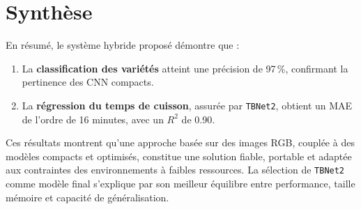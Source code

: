 \section{Synthèse}

En résumé, le système hybride proposé démontre que :
\begin{enumerate}
	\item La \textbf{classification des variétés} atteint une précision de 97\,\%, confirmant la pertinence des CNN compacts.
	\item La \textbf{régression du temps de cuisson}, assurée par \texttt{TBNet2}, obtient un MAE de l’ordre de 16 minutes, avec un $R^2$ de 0.90.
\end{enumerate}

Ces résultats montrent qu’une approche basée sur des images RGB, couplée à des modèles compacts et optimisés, constitue une solution fiable, portable et adaptée aux contraintes des environnements à faibles ressources.
La sélection de \texttt{TBNet2} comme modèle final s’explique par son meilleur équilibre entre performance, taille mémoire et capacité de généralisation.